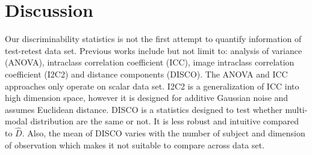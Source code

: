 \documentclass{article}
\begin{document}
\section{Discussion}


Our discriminability statistics is not the first attempt to quantify information of test-retest data set. Previous works include but not limit to: analysis of variance (ANOVA), intraclass correlation coefficient (ICC), image intraclass correlation coefficient (I2C2) and distance components (DISCO). The ANOVA and ICC approaches only operate on scalar data set. I2C2 is a generalization of ICC into high dimension space, however it is designed for additive Gaussian noise and assumes Euclidean distance. DISCO is a statistics designed to test whether multi-modal distribution are the same or not. It is less robust and intuitive compared to $\hat{D}$. Also, the mean of DISCO varies with the number of subject and dimension of observation which makes it not suitable to compare across data set.




% 
% 
% 
% 
% 
% 
% 
% 



\appendix






\newpage
\small{


}
\end{document}
